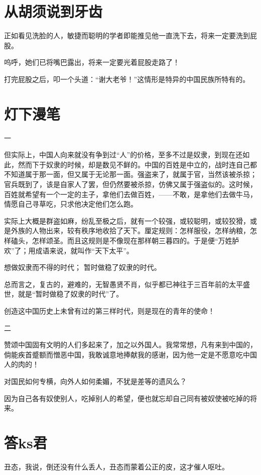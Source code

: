 \documentclass[a4paper]{ctexart}
\begin{document}
\begin{sloppy}
        \section{
            从胡须说到牙齿
        }
        

正如看见洗脸的人，敏捷而聪明的学者即能推见他一直洗下去，将来一定要洗到屁股。

呜呼，她们已将嘴巴露出，将来一定要光着屁股走路了！

打完屁股之后，叩一个头道：“谢大老爷！”这情形是特异的中国民族所特有的。

        \section{
            灯下漫笔
        }

一

但实际上，中国人向来就没有争到过“人”的价格，至多不过是奴隶，到现在还如此，然而下于奴隶的时候，却是数见不鲜的。中国的百姓是中立的，战时连自己都不知道属于那一面，但又属于无论那一面。强盗来了，就属于官，当然该被杀掠；官兵既到了，该是自家人了罢，但仍然要被杀掠，仿佛又属于强盗似的。这时候，百姓就希望有一个一定的主子，拿他们去做百姓，——不敢，是拿他们去做牛马，情愿自己寻草吃，只求他决定他们怎么跑。

实际上大概是群盗如麻，纷乱至极之后，就有一个较强，或较聪明，或较狡猾，或是外族的人物出来，较有秩序地收拾了天下。厘定规则：怎样服役，怎样纳粮，怎样磕头，怎样颂圣。而且这规则是不像现在那样朝三暮四的。于是便“万姓胪欢”了；用成语来说，就叫作“天下太平”。

想做奴隶而不得的时代；
暂时做稳了奴隶的时代。

总而言之，复古的，避难的，无智愚贤不肖，似乎都已神往于三百年前的太平盛世，就是“暂时做稳了奴隶的时代”了。

创造这中国历史上未曾有过的第三样时代，则是现在的青年的使命！


二

赞颂中国固有文明的人们多起来了，加之以外国人。我常常想，凡有来到中国的，倘能疾首蹙额而憎恶中国，我敢诚意地捧献我的感谢，因为他一定是不愿意吃中国人的肉的！

对国民如何专横，向外人如何柔媚，不犹是差等的遗风么？

因为自己各有奴使别人，吃掉别人的希望，便也就忘却自己同有被奴使被吃掉的将来。

        \section{
            答ks君
        }
        丑态，我说，倒还没有什么丢人，丑态而蒙着公正的皮，这才催人呕吐。
        


\end{sloppy}
\end{document}
